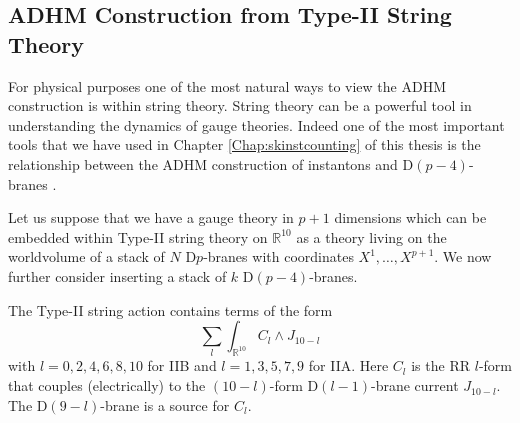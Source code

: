 \documentclass[main.tex]{subfiles}
\begin{document}
\subsection{ADHM Construction from Type-II String Theory}\label{intro:secadhmstring}
For physical purposes one of the most natural ways to view the ADHM construction is within string theory.  String theory can be a powerful tool in understanding the dynamics of gauge theories.  Indeed one of the most important tools that we have used in Chapter \ref{Chap:skinstcounting} of this thesis is the relationship between the ADHM construction of instantons and D$(p-4)$-branes \cite{Douglas:1996uz,Douglas:1995bn,Witten:1994tz,Tong:2005un,Polchinski:1996na,Dorey:2002ik,Dorey:2000zq}.

Let us suppose that we have a gauge theory in $p+1$ dimensions which can be embedded within Type-II string theory on $\mathbb{R}^{10}$ as a theory living on the worldvolume of a stack of $N$ D$p$-branes with coordinates $X^1,\dots,X^{p+1}$.  We now further consider inserting a stack of $k$ D$(p-4)$-branes.

The Type-II string action contains terms of the form
\begin{equation}
\sum_{l}\int_{\mathbb{R}^{10}} C_l\wedge J_{10-l}
\end{equation}
with $l=0,2,4,6,8,10$ for IIB and $l=1,3,5,7,9$ for IIA.  Here $C_l$ is the RR $l$-form that couples (electrically) to the $(10-l)$-form D$(l-1)$-brane current $J_{10-l}$. The D$(9-l)$-brane is a source for $C_l$.
\end{document}
